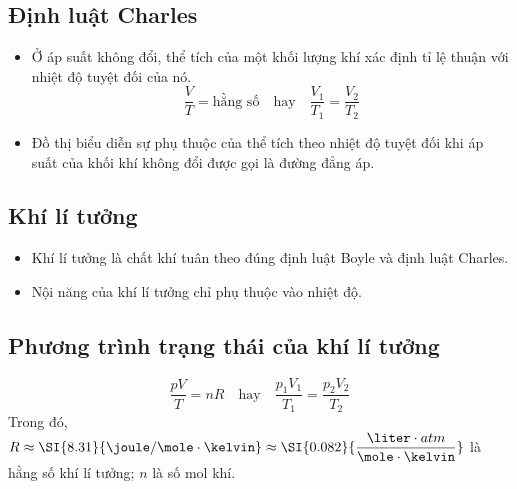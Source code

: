\subsection{Định luật Charles}
\begin{itemize}
	\item Ở áp suất không đổi, thể tích của một khối lượng khí xác định tỉ lệ thuận với nhiệt độ tuyệt đối của nó.
	$$\dfrac{V}{T}=\text{hằng số}\quad \text{hay}\quad \dfrac{V_1}{T_1}=\dfrac{V_2}{T_2}$$
	\item Đồ thị biểu diễn sự phụ thuộc của thể tích theo nhiệt độ tuyệt đối khi áp suất của khối khí không đổi được gọi là đường đẳng áp.
	\begin{center}
	\end{center}
\end{itemize}
\subsection{Khí lí tưởng}
\begin{itemize}
	\item Khí lí tưởng là chất khí tuân theo đúng định luật Boyle và định luật Charles.
	\item Nội năng của khí lí tưởng chỉ phụ thuộc vào nhiệt độ.
\end{itemize}
\subsection{Phương trình trạng thái của khí lí tưởng}
$$\dfrac{pV}{T}=nR\quad \text{hay}\quad \dfrac{p_1V_1}{T_1}=\dfrac{p_2V_2}{T_2}$$
Trong đó, $R\approx \SI{8.31}{\joule/\mole\cdot\kelvin} \approx\SI{0.082}{\dfrac{\liter\cdot atm}{\mole\cdot\kelvin}}$
là hằng số khí lí tưởng; $n$ là số mol khí.